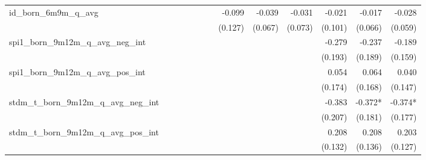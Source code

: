 \begin{tabular}{lrrrrrrrrrrrr}
id\_born\_6m9m\_q\_avg                      &              &              &              &              &              &              &       -0.099 &       -0.039 &       -0.031 &       -0.021 &       -0.017 &       -0.028 \\ 
                                            &              &              &              &              &              &              &      (0.127) &      (0.067) &      (0.073) &      (0.101) &      (0.066) &      (0.059) \\ 
spi1\_born\_9m12m\_q\_avg\_neg\_int         &              &              &              &              &              &              &              &              &              &       -0.279 &       -0.237 &       -0.189 \\ 
                                            &              &              &              &              &              &              &              &              &              &      (0.193) &      (0.189) &      (0.159) \\ 
spi1\_born\_9m12m\_q\_avg\_pos\_int         &              &              &              &              &              &              &              &              &              &        0.054 &        0.064 &        0.040 \\ 
                                            &              &              &              &              &              &              &              &              &              &      (0.174) &      (0.168) &      (0.147) \\ 
stdm\_t\_born\_9m12m\_q\_avg\_neg\_int      &              &              &              &              &              &              &              &              &              &       -0.383 &      -0.372* &      -0.374* \\ 
                                            &              &              &              &              &              &              &              &              &              &      (0.207) &      (0.181) &      (0.177) \\ 
stdm\_t\_born\_9m12m\_q\_avg\_pos\_int      &              &              &              &              &              &              &              &              &              &        0.208 &        0.208 &        0.203 \\ 
                                            &              &              &              &              &              &              &              &              &              &      (0.132) &      (0.136) &      (0.127) \\ 

\end{tabular}
